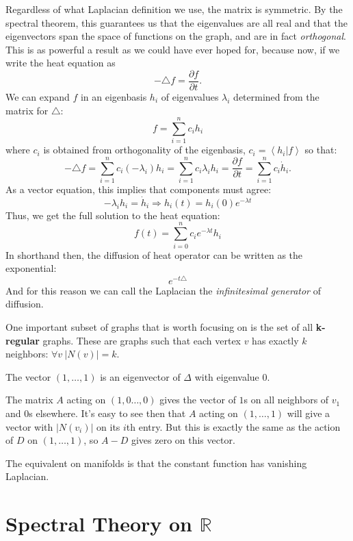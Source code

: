\documentclass[../master.tex]{subfiles}
\begin{document}
	Regardless of what Laplacian definition we use, the matrix is symmetric. By the spectral theorem, this guarantees us that the eigenvalues are all real and that the eigenvectors span the space of functions on the graph, and are in fact \emph{orthogonal}. This is as powerful a result as we could have ever hoped for, because now, if we write the heat equation as
	\begin{equation}
		-\triangle f = \frac{\partial f}{\partial t}.
	\end{equation}
	We can expand $f$ in an eigenbasis $h_i$ of eigenvalues $\lambda_i$ determined from the matrix for $\triangle$:
	\begin{equation}
		f = \sum_{i=1}^n c_i h_i
	\end{equation}
	where $c_i$ is obtained from orthogonality of the eigenbasis, $c_i = \left< h_i | f \right>$ so that:
	\begin{equation}
		-\triangle f = \sum_{i=1}^n c_i (-\lambda_i) h_i = \sum_{i=1}^n c_i \lambda_i h_i = \frac{\partial f}{\partial t} = \sum_{i=1}^n c_i \dot h_i.
	\end{equation}
	As a vector equation, this implies that components must agree:
	\begin{equation}
		- \lambda_i h_i = \dot h_i \Rightarrow h_i(t) = h_i(0) e^{-\lambda t}
	\end{equation}
	Thus, we get the full solution to the heat equation:
	\begin{equation}
		f(t) = \sum_{i=0}^n c_i e^{-\lambda t} h_i
	\end{equation}
	In shorthand then, the diffusion of heat operator can be written as the exponential:
	\begin{equation*}
		e^{-t \triangle }
	\end{equation*}
	And for this reason we can call the Laplacian the \emph{infinitesimal generator} of diffusion. 
	
	One important subset of graphs that is worth focusing on is the set of all \textbf{k-regular} graphs. These are graphs such that each vertex $v$ has exactly $k$ neighbors: $\forall v ~ |N(v)|=k$.
	
	\begin{obs}
		The vector $(1, \dots, 1)$ is an eigenvector of $\Delta$ with eigenvalue $0$.
	\end{obs}
	The matrix $A$ acting on $(1, 0 \dots, 0)$ gives the vector of $1$s on all neighbors of $v_1$ and $0$s elsewhere. It's easy to see then that $A$ acting on $(1, \dots, 1)$ will give a vector with $|N(v_i)|$ on its $i$th entry. But this is exactly the same as the action of $D$ on $(1, \dots, 1)$, so $A-D$ gives zero on this vector. 
	
	The equivalent on manifolds is that the constant function has vanishing Laplacian. 
	



\section{Spectral Theory on $\mathbb R$} %
\label{sec:spectral_theory_on_mathbf_r}

\end{document}
